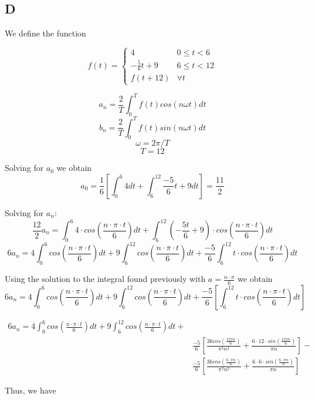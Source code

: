\documentclass{article}
\begin{document}
\pagebreak

\subsection*{D}

We define the function

\[ f(t) = \begin{cases}
      4 & 0\leq t < 6 \\
      -\frac{5}{6}t+9 & 6\leq t < 12 \\
      f(t + 12) & \forall t
   \end{cases}
\]


$$a_n = \frac{2}{T} \int_{0}^{T} f(t) cos(n\omega t) dt$$
$$b_n = \frac{2}{T} \int_{0}^{T} f(t) sin(n\omega t) dt$$
$$\omega = 2\pi/T$$
$$T = 12$$

Solving for $a_0$ we obtain   
$$a_0 = \frac{1}{6} \left[ \int_{0}^{6} 4dt + \int_6^{12} \frac{-5}{6} t + 9dt \right ] = \frac{11}{2}$$

Solving for $a_n$:
$$\frac{12}{2}a_n =  \int_{0}^{6} 4\cdot cos\left(\frac{n\cdot \pi\cdot t}{6}\right) dt + \int_{6}^{12} \left(-\frac{5t}{6} + 9\right) \cdot cos\left(\frac{n\cdot \pi\cdot t}{6}\right)dt$$
$$6a_n =  4\int_{0}^{6} cos\left(\frac{n\cdot \pi\cdot t}{6}\right) dt + 9 \int_{6}^{12} cos\left(\frac{n\cdot \pi\cdot t}{6}\right)dt + \frac{-5}{6} \int_{6}^{12} t\cdot cos\left(\frac{n\cdot \pi\cdot t}{6}\right)dt$$

Using the solution to the integral found previously with $a=\frac{n\cdot \pi}{6}$ we obtain
$$6a_n =  4\int_{0}^{6} cos\left(\frac{n\cdot \pi\cdot t}{6}\right) dt + 9 \int_{6}^{12} cos\left(\frac{n\cdot \pi\cdot t}{6}\right)dt + \frac{-5}{6}
\left[ \int_{6}^{12} t\cdot cos\left(\frac{n\cdot \pi\cdot t}{6}\right)dt\right]$$

\begin{align*}
6a_n =  4\int_{0}^{6} cos\left(\frac{n\cdot \pi\cdot t}{6}\right) dt + 9 \int_{6}^{12} cos\left(\frac{n\cdot \pi\cdot t}{6}\right)dt + \\
&\frac{-5}{6} \left[ \frac{36cos\left(\frac{12 \pi n}{6}\right)}{\pi^2n^2} + \frac{6 \cdot 12 \cdot sin\left(\frac{12 \pi n}{6}\right)}{\pi n} \right ] - \\
&\frac{-5}{6} \left[ \frac{36cos\left(\frac{6 \cdot \pi n}{6}\right)}{\pi^2n^2} + \frac{6 \cdot 6 \cdot sin\left(\frac{6 \cdot \pi n}{6}\right)}{\pi n} \right]
\end{align*}

Thus, we have
\end{document}
